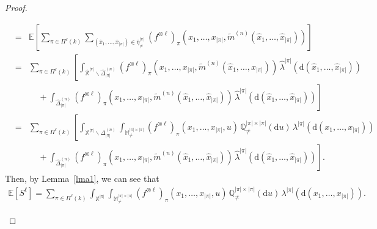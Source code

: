 \documentclass{article}
\theoremstyle{definition}
\numberwithin{equation}{section}
\theoremstyle{remark}
\newcommand{\E}{\mathbb{E}}
\begin{document}
\begin{proof}
\begin{enumerate}
\begin{eqnarray*}
&=&\E\left[\sum_{\pi\in\Pi^\ell(k)}\sum_{(\hat{x}_1,\dots,\hat{x}_{|\pi|})\in\hat{\eta}^{|\pi|}_{\ne}}(f^{\otimes\ell})_{\pi}(x_1,\dots,x_{|\pi|},\tilde{m}^{(n)}(\hat{x}_1,\ldots,\hat{x}_{|\pi|}))\right]\\
&=&\sum_{\pi\in\Pi^\ell(k)}\left[\int_{\widehat{\mathbb{X}}^{|\pi|}\backslash\widehat{\Delta}_{|\pi|}^{(n)}} (f^{\otimes\ell})_{\pi}(x_1,\dots,x_{|\pi|},\tilde{m}^{(n)}(\hat{x}_1,\ldots,\hat{x}_{|\pi|})) \, \widehat{\lambda}^{|\pi|}(\mathrm{d}(\hat{x}_1,\ldots,\hat{x}_{|\pi|}) )\right.\\
&&\left.\ \ \ \ \ +\int_{\widehat{\Delta}_{|\pi|}^{(n)}}(f^{\otimes\ell})_{\pi}(x_1,\dots,x_{|\pi|},\tilde{m}^{(n)}(\hat{x}_1,\ldots,\hat{x}_{|\pi|})) \, \widehat{\lambda}^{|\pi|}(\mathrm{d}(\hat{x}_1,\ldots,\hat{x}_{|\pi|}) )
\right]\\
&=&\sum_{\pi\in\Pi^\ell(k)}\left[\int_{\mathbb{X}^{|\pi|}\backslash\Delta_{|\pi|}^{(n)}} \int_{\mathbb{M}^{|\pi|\times |\pi|}_{\neq}} (f^{\otimes\ell})_{\pi}(x_1,\dots,x_{|\pi|},u) \, \mathbb{Q}_{\neq}^{|\pi|\times |\pi|}(\mathrm{d}u) \, \lambda^{|\pi|}(\mathrm{d}(x_1,\ldots,x_{|\pi|}))\right.\\
&&\left.\ \ \ \ \ +\int_{\widehat{\Delta}_{|\pi|}^{(n)}}(f^{\otimes\ell})_{\pi}(x_1,\dots,x_{|\pi|},\tilde{m}^{(n)}(\hat{x}_1,\ldots,\hat{x}_{|\pi|})) \, \widehat{\lambda}^{|\pi|}(\mathrm{d}(\hat{x}_1,\ldots,\hat{x}_{|\pi|}) )
\right].
\end{eqnarray*}
Then, by Lemma~\ref{lma1}, we can see that 
\begin{eqnarray*}
    \E\left[S^{\ell}\right]=\sum_{\pi\in\Pi^\ell(k)}\int_{\mathbb{X}^{|\pi|}} \int_{\mathbb{M}^{|\pi|\times |\pi|}_{\neq}} (f^{\otimes\ell})_{\pi}(x_1,\dots,x_{|\pi|},u) \, \mathbb{Q}_{\neq}^{|\pi|\times |\pi|}(\mathrm{d}u) \, \lambda^{|\pi|}(\mathrm{d}(x_1,\ldots,x_{|\pi|})).
\end{eqnarray*}
\end{enumerate}
\end{proof}
\end{document}
